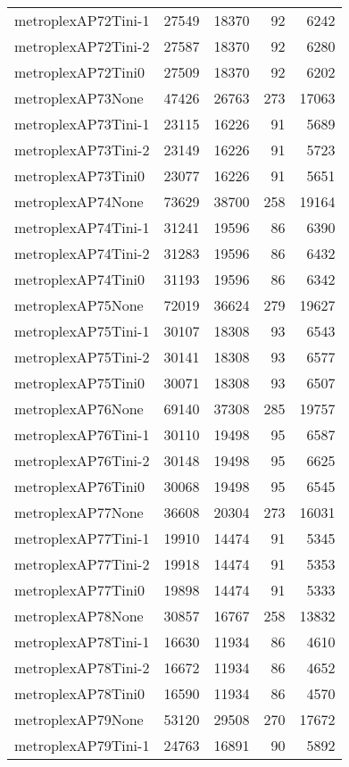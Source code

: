 \begin{longtable}{lrrrr}
metroplexAP72Tini-1 & 27549 & 18370 & 92 & 6242 \\
metroplexAP72Tini-2 & 27587 & 18370 & 92 & 6280 \\
metroplexAP72Tini0 & 27509 & 18370 & 92 & 6202 \\
metroplexAP73None & 47426 & 26763 & 273 & 17063 \\
metroplexAP73Tini-1 & 23115 & 16226 & 91 & 5689 \\
metroplexAP73Tini-2 & 23149 & 16226 & 91 & 5723 \\
metroplexAP73Tini0 & 23077 & 16226 & 91 & 5651 \\
metroplexAP74None & 73629 & 38700 & 258 & 19164 \\
metroplexAP74Tini-1 & 31241 & 19596 & 86 & 6390 \\
metroplexAP74Tini-2 & 31283 & 19596 & 86 & 6432 \\
metroplexAP74Tini0 & 31193 & 19596 & 86 & 6342 \\
metroplexAP75None & 72019 & 36624 & 279 & 19627 \\
metroplexAP75Tini-1 & 30107 & 18308 & 93 & 6543 \\
metroplexAP75Tini-2 & 30141 & 18308 & 93 & 6577 \\
metroplexAP75Tini0 & 30071 & 18308 & 93 & 6507 \\
metroplexAP76None & 69140 & 37308 & 285 & 19757 \\
metroplexAP76Tini-1 & 30110 & 19498 & 95 & 6587 \\
metroplexAP76Tini-2 & 30148 & 19498 & 95 & 6625 \\
metroplexAP76Tini0 & 30068 & 19498 & 95 & 6545 \\
metroplexAP77None & 36608 & 20304 & 273 & 16031 \\
metroplexAP77Tini-1 & 19910 & 14474 & 91 & 5345 \\
metroplexAP77Tini-2 & 19918 & 14474 & 91 & 5353 \\
metroplexAP77Tini0 & 19898 & 14474 & 91 & 5333 \\
metroplexAP78None & 30857 & 16767 & 258 & 13832 \\
metroplexAP78Tini-1 & 16630 & 11934 & 86 & 4610 \\
metroplexAP78Tini-2 & 16672 & 11934 & 86 & 4652 \\
metroplexAP78Tini0 & 16590 & 11934 & 86 & 4570 \\
metroplexAP79None & 53120 & 29508 & 270 & 17672 \\
metroplexAP79Tini-1 & 24763 & 16891 & 90 & 5892 \\

\end{longtable}
